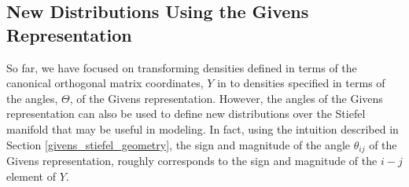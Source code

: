 \documentclass[ba]{imsart}
\numberwithin{equation}{section}
\theoremstyle{plain}
\begin{document}




\subsection{New Distributions Using the Givens Representation}
So far, we have focused on transforming densities defined in terms of the canonical orthogonal matrix coordinates, $Y$ in to densities specified in terms of the angles, $\Theta$, of the Givens representation. However, the angles of the Givens representation can also be used to define new distributions over the Stiefel manifold that may be useful in modeling. In fact, using the intuition described in Section \ref{givens_stiefel_geometry}, the sign and magnitude of the angle $\theta_{ij}$ of the Givens representation, roughly corresponds to the sign and magnitude of the $i-j$ element of $Y$.
\end{document}
